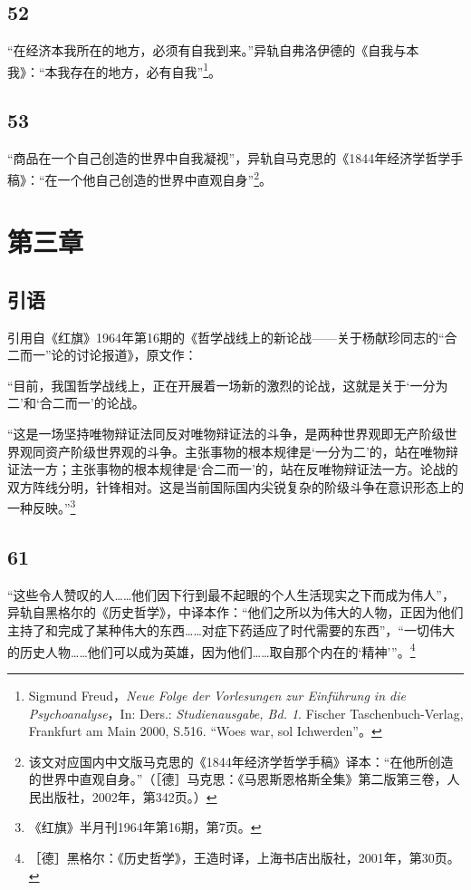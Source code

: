\documentclass[fontset=fandol, a4paper, 12pt, openright]{ctexbook}
\begin{document}
\subsection*{52}
“在经济本我所在的地方，必须有自我到来。”异轨自弗洛伊德的《自我与本我》：“本我存在的地方，必有自我”\footnote{Sigmund Freud，\textit{Neue Folge der Vorlesungen zur Einführung in die Psychoanalyse}，In: Ders.: \textit{Studienausgabe, Bd. 1}. Fischer Taschenbuch-Verlag, Frankfurt am Main 2000, S.516. “Woes war, sol Ichwerden”。}。

\subsection*{53}
“商品在一个自己创造的世界中自我凝视”，异轨自马克思的《1844年经济学哲学手稿》：“在一个他自己创造的世界中直观自身”\footnote{该文对应国内中文版马克思的《1844年经济学哲学手稿》译本：“在他所创造的世界中直观自身。”（［德］马克思：《马恩斯恩格斯全集》第二版第三卷，人民出版社，2002年，第342页。）}。

\section*{第三章}

\subsection*{引语}
引用自《红旗》1964年第16期的《哲学战线上的新论战——关于杨献珍同志的“合二而一”论的讨论报道》，原文作：

“目前，我国哲学战线上，正在开展着一场新的激烈的论战，这就是关于‘一分为二’和‘合二而一’的论战。

“这是一场坚持唯物辩证法同反对唯物辩证法的斗争，是两种世界观即无产阶级世界观同资产阶级世界观的斗争。主张事物的根本规律是‘一分为二’的，站在唯物辩证法一方；主张事物的根本规律是‘合二而一’的，站在反唯物辩证法一方。论战的双方阵线分明，针锋相对。这是当前国际国内尖锐复杂的阶级斗争在意识形态上的一种反映。”\footnote{《红旗》半月刊1964年第16期，第7页。}

\subsection*{61}
“这些令人赞叹的人……他们因下行到最不起眼的个人生活现实之下而成为伟人”，异轨自黑格尔的《历史哲学》，中译本作：“他们之所以为伟大的人物，正因为他们主持了和完成了某种伟大的东西……对症下药适应了时代需要的东西”，“一切伟大的历史人物……他们可以成为英雄，因为他们……取自那个内在的‘精神’”。\footnote{［德］黑格尔：《历史哲学》，王造时译，上海书店出版社，2001年，第30页。}
\end{document}
